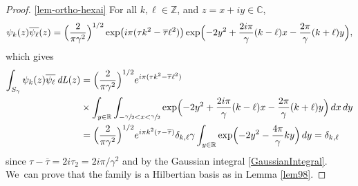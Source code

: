 \documentclass[JEP,XML,SOM,Unicode,NoFloatCountersInSection,published]{cedram}
\DeclareMathOperator{\dL}{\mathit{dL}}
\theoremstyle{definition}
\let\EE\exp
\let\ov\overline
\newcommand\C{\mathbb C}
\newcommand\R{\mathbb R}
\newcommand\Z{\mathbb Z}
\newcommand{\Bpa}[1]{\Bigl(#1\Bigr)}
\begin{document}
\skpt
\begin{proof}
\eqref{lem-ortho-hexai} For all $k,\ell \in \Z$, and $z=x+iy \in \C$,
\[
\psi_{k}(z)\ov{\psi_{\ell}}(z)= \Bpa{\frac{2}{\pi \gamma^2}}^{1/2}\EE\bigl({i\pi(\tau k^2-\overline{\tau}\ell^2)}\bigr) \EE\Bigl({-2y^2+\frac{2i\pi}{\gamma}(k-\ell)x-\frac{2\pi}{\gamma}(k+\ell)y}\Bigr),
\]
which gives
\begin{align*}
\int_{S_{\gamma}}\psi_{k}(z)\ov{\psi_{\ell}} \dL(z)
& = \Bpa{\frac{2}{\pi \gamma^2}}^{1/2} e^{i\pi(\tau k^2-\overline{\tau}\ell^2)}\\
&\times\int_{y\in\R}\int_{- \sfrac \gamma 2 < x < \sfrac \gamma 2} \EE\Bigl({-2y^2+\frac{2i\pi}{\gamma}(k-\ell)x-\frac{2\pi}{\gamma}(k+\ell)y}\Bigr)\,dx\, dy \\
&= \Bpa{\frac{2}{\pi \gamma^2}}^{1/2}e^{i\pi k^2(\tau -\overline{\tau})} \delta_{k,\ell} \gamma \int_{y\in\R}\EE\Bigl({-2y^2-\frac{4\pi}{\gamma}ky}\Bigr) \, dy= \delta_{k,\ell}
\end{align*}
since $\tau - \ov{\tau} = 2i \tau_2 = 2i{\pi}/{\gamma^2}$ and by the Gaussian integral \eqref{GaussianIntegral}. We~can prove that the family is a Hilbertian basis as in Lemma \ref{lem98}.


\end{proof}
\end{document}
